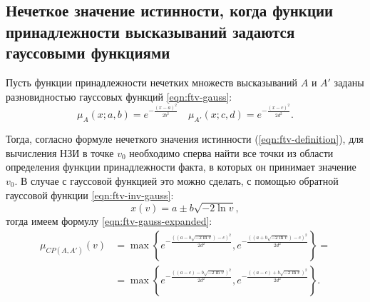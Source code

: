 \subsection{Нечеткое значение истинности, когда функции принадлежности высказываний задаются гауссовыми функциями}

Пусть функции принадлежности нечетких множеств высказываний $A$ и $A'$ заданы разновидностью гауссовых функций \eqref{eqn:ftv-gauss}:
\begin{equation}
	\label{eqn:ftv-gauss}
	\mu_{A}(x; a, b) = e^{-\frac{(x-a)^2}{2b^2}} \quad \mu_{A'}(x; c, d) = e^{-\frac{(x-c)^2}{2d^2}}.
\end{equation}

Тогда, согласно формуле нечеткого значения истинности (\ref{eqn:ftv-definition}), для вычисления НЗИ в точке $v_0$ необходимо сперва найти все точки из области определения функции принадлежности факта, в которых он принимает значение $v_0$. В случае с гауссовой функцией это можно сделать, с помощью обратной гауссовой функции \eqref{eqn:ftv-inv-gauss}:
\begin{equation}
	\label{eqn:ftv-inv-gauss}
	x(v) = a \pm b\sqrt{-2\ln{v}},
\end{equation}
тогда имеем формулу \eqref{eqn:ftv-gauss-expanded}:
\begin{equation}
 	\label{eqn:ftv-gauss-expanded}
	\begin{aligned}
		\mu_{CP(A, A')}(v) &= \max\left\{e^{-\frac{((a - b\sqrt{-2\ln v})-c)^2}{2 d^2}},e^{-\frac{((a + b\sqrt{-2\ln v})-c)^2}{2 d^2}}\right\} = \\
		&= \max\left\{e^{-\frac{((a-c) - b\sqrt{-2\ln v})^2}{2 d^2}},e^{-\frac{((a-c) + b\sqrt{-2\ln v})^2}{2 d^2}}\right\}.
	\end{aligned}
\end{equation}

